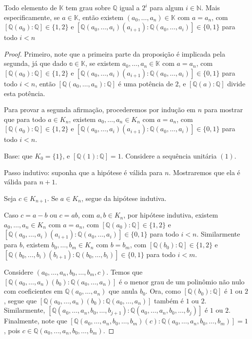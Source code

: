 \begin{prop}
    Todo elemento de $\mathbb K$ tem grau sobre $\mathbb Q$ igual a $2^i$ para algum $i\in \mathbb N$. Mais especificamente, se $a \in \mathbb K$, então existem $(a_0, \dots, a_n)\in \mathbb K$ com $a=a_n$, com $[\mathbb Q(a_0): \mathbb Q]\in \{1, 2\}$ e $[\mathbb Q(a_0, \dots, a_i)(a_{i+1}):\mathbb Q(a_0, \dots, a_i)]\in \{0, 1\}$ para todo $i<n$
\end{prop}
\begin{proof}
    Primeiro, note que a primeira parte da proposição é implicada pela segunda, já que dado $\mathbb a \in \mathbb K$, se existem $a_0, \dots, a_n\in \mathbb K$ com $a=a_n$, com $[\mathbb Q(a_0): \mathbb Q]\in \{1, 2\}$ e $[\mathbb Q(a_0, \dots, a_i)(a_{i+1}):\mathbb Q(a_0, \dots, a_i)]\in \{0, 1\}$ para todo $i<n$, então $[\mathbb Q(a_0, \dots, a_n):\mathbb Q]$ é uma potência de $2$, e $[\mathbb Q(a):\mathbb Q]$ divide esta potência.

    Para provar a segunda afirmação, procederemos por indução em $n$ para mostrar que para todo $a \in K_n$, existem $a_0, \dots, a_n\in K_n$ com $a=a_n$, com $[\mathbb Q(a_0): \mathbb Q]\in \{1, 2\}$ e $[\mathbb Q(a_0, \dots, a_i)(a_{i+1}):\mathbb Q(a_0, \dots, a_i)]\in \{0, 1\}$ para todo $i<n$.

    Base: que $K_0=\{1\}$, e $[\mathbb Q(1):\mathbb Q]=1$. Considere a sequência unitária $(1)$.

    Passo indutivo: suponha que a hipótese é válida para $n$. Mostraremos que ela é válida para $n+1$.

    Seja $c \in K_{n+1}$. Se $a \in K_n$, segue da hipótese indutiva.

    Caso $c=a-b$ ou $c=ab$, com $a, b \in K_n$, por hipótese indutiva, existem $a_0, \dots, a_n\in K_n$ com $a=a_n$, com $[\mathbb Q(a_0): \mathbb Q]\in \{1, 2\}$ e $[\mathbb Q(a_0, \dots, a_i)(a_{i+1}):\mathbb Q(a_0, \dots, a_i)]\in \{0, 1\}$ para todo $i<n$. Similarmente para $b$, existem $b_0, \dots, b_m\in K_n$ com $b=b_m$, com $[\mathbb Q(b_0): \mathbb Q]\in \{1, 2\}$ e $[\mathbb Q(b_0, \dots, b_i)(b_{i+1}):\mathbb Q(b_0, \dots, b_i)]\in \{0, 1\}$ para todo $i<m$.

    Considere $(a_0, \dots, a_n, b_0, \dots, b_m, c)$. Temos que $[\mathbb Q(a_0, \dots, a_n)(b_0):\mathbb Q(a_0, \dots, a_n)]$ é o menor grau de um polinômio não nulo com coeficientes em $\mathbb Q(a_0, \dots, a_n)$ que anula $b_0$. Ora, como $[\mathbb Q(b_0):\mathbb Q]$ é $1$ ou $2$, segue que $[\mathbb Q(a_0, \dots, a_n)(b_0):\mathbb Q(a_0, \dots, a_n)]$ também é $1$ ou $2$.
    Similarmente, $[\mathbb Q(a_0, \dots, a_n, b_0, \dots, b_{j+1}):\mathbb Q(a_0, \dots, a_n, b_0, \dots, b_{j})]$ é $1$ ou $2$.
    Finalmente, note que $[\mathbb Q(a_0, \dots, a_n, b_0, \dots, b_m)(c):\mathbb Q(a_0, \dots, a_n, b_0, \dots, b_m)]=1$,  pois $c \in \mathbb Q(a_0, \dots, a_n, b_0, \dots, b_m)$.


\end{proof}
